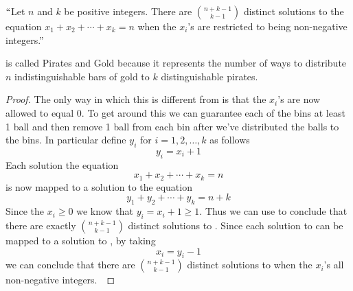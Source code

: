         \begin{corollary}
            $``$Let $n$ and $k$ be positive integers. There are $\binom{n + k - 1}{k - 1}$ distinct
            solutions to the equation $x_1 + x_2 + \cdots + x_k = n$ when the $x_i$'s are restricted
            to being non-negative integers.''
            \label{Pirates and Gold}
        \end{corollary}
        \begin{note}
             is called Pirates and Gold because it represents
            the number of ways to distribute $n$ indistinguishable bars of gold to $k$
            distinguishable pirates.
        \end{note}
        \begin{proof}
            The only way in which this is different from 
            is that the $x_i$'s are now allowed to equal 0. To get around this we can
            guarantee each of the bins at least 1 ball and then remove 1 ball from each bin
            after we've distributed the balls to the bins. In particular define $y_i$ for
            $i = 1, 2, \dots, k$ as follows
            \begin{equation}
                y_i = x_i + 1
            \end{equation}
            Each solution the equation
            \begin{equation}
                x_1 + x_2 + \cdots + x_k = n
                \label{Pirates and Gold equation 2}
            \end{equation}
            is now mapped to a solution to the equation
            \begin{equation}
                y_1 + y_2 + \cdots + y_k = n + k
                \label{Pirates and Gold equation 1}
            \end{equation}
            Since the $x_i \ge 0$ we know that $y_i = x_i + 1 \ge 1$. Thus we can use
             to conclude that there are exactly $\binom{n + k - 1}{k - 1}$
            distinct solutions to . Since each solution to
             can be mapped to a solution to
            , by taking
            \begin{equation}
                x_i = y_i - 1
            \end{equation}
            we can conclude that there are $\binom{n + k - 1}{k - 1}$ distinct solutions
            to  when the $x_i$'s all non-negative
            integers.~\QED
        \end{proof}

